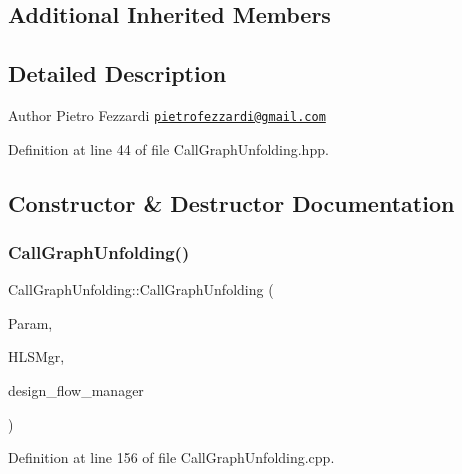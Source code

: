 \subsection*{Additional Inherited Members}


\subsection{Detailed Description}
\begin{DoxyAuthor}{Author}
Pietro Fezzardi \href{mailto:pietrofezzardi@gmail.com}{\tt pietrofezzardi@gmail.\+com} 
\end{DoxyAuthor}


Definition at line 44 of file Call\+Graph\+Unfolding.\+hpp.



\subsection{Constructor \& Destructor Documentation}
\mbox{\label{classCallGraphUnfolding_a18926eb72c9ee114b6d25d651f7e4c8a}} 
\subsubsection{\texorpdfstring{Call\+Graph\+Unfolding()}{CallGraphUnfolding()}}
{\footnotesize\ttfamily Call\+Graph\+Unfolding\+::\+Call\+Graph\+Unfolding (\begin{DoxyParamCaption}\item[{const \hyperlink{Parameter_8hpp_a37841774a6fcb479b597fdf8955eb4ea}{Parameter\+Const\+Ref}}]{Param,  }\item[{const \hyperlink{hls__manager_8hpp_acd3842b8589fe52c08fc0b2fcc813bfe}{H\+L\+S\+\_\+manager\+Ref}}]{H\+L\+S\+Mgr,  }\item[{const Design\+Flow\+Manager\+Const\+Ref}]{design\+\_\+flow\+\_\+manager }\end{DoxyParamCaption})}



Definition at line 156 of file Call\+Graph\+Unfolding.\+cpp.

\mbox{\label{classCallGraphUnfolding_a0ad20582a65bc45f2e995784c9f6825c}} 
